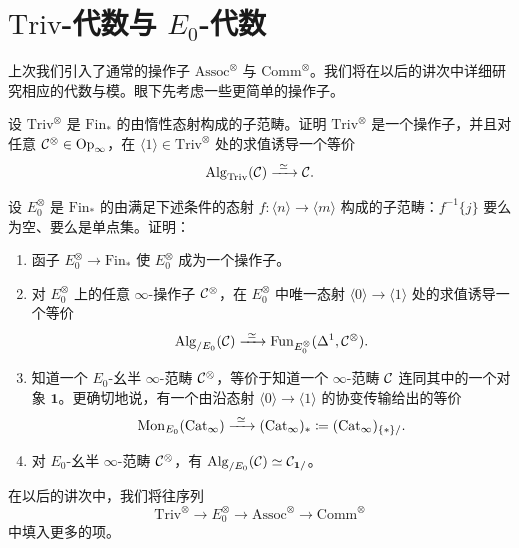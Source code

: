 
\section{$\mathrm{Triv}$-代数与 $E_{0}$-代数}

\nitem\label{L22-2.1} 上次我们引入了通常的操作子 $\mathrm{Assoc}^{\otimes}$ 与 $\mathrm{Comm}^{\otimes}$。我们将在以后的讲次中详细研究相应的代数与模。眼下先考虑一些更简单的操作子。

\begin{exercise}\label{L22-2.2}
设 $\mathrm{Triv}^{\otimes}$ 是 $\mathrm{Fin}_{*}$ 的由惰性态射构成的子范畴。证明 $\mathrm{Triv}^{\otimes}$ 是一个操作子，并且对任意 $\mathcal{C}^{\otimes}\in\mathrm{Op}_{\infty}$，在 $\langle1\rangle\in\mathrm{Triv}^{\otimes}$ 处的求值诱导一个等价
\[
\Alg_{\mathrm{Triv}}(\cC)\xrightarrow{\ \simeq\ }\cC.
\]
\end{exercise}

\begin{exercise}\label{L22-2.3}
设 $E_{0}^{\otimes}$ 是 $\mathrm{Fin}_{*}$ 的由满足下述条件的态射 $f\colon\langle n\rangle\to\langle m\rangle$ 构成的子范畴：$f^{-1}\{j\}$ 要么为空、要么是单点集。证明：
\begin{enumerate}[label=(\arabic*),leftmargin=2.4em,itemsep=0.1em]
\item 函子 $E_{0}^{\otimes}\to\mathrm{Fin}_{*}$ 使 $E_{0}^{\otimes}$ 成为一个操作子。
\item 对 $E_{0}^{\otimes}$ 上的任意 $\infty$-操作子 $\mathcal{C}^{\otimes}$，在 $E_{0}^{\otimes}$ 中唯一态射 $\langle0\rangle\to\langle1\rangle$ 处的求值诱导一个等价
\[
\Alg_{/E_{0}}(\cC)\xrightarrow{\ \simeq\ }\Fun_{E_{0}^{\otimes}}(\Delta^{1},\cC^{\otimes}).
\]
\item 知道一个 $E_{0}$-幺半 $\infty$-范畴 $\mathcal{C}^{\otimes}$，等价于知道一个 $\infty$-范畴 $\mathcal{C}$ 连同其中的一个对象 $\mathbf{1}$。更确切地说，有一个由沿态射 $\langle0\rangle\to\langle1\rangle$ 的协变传输给出的等价
\[
\Mon_{E_{0}}(\Cat_{\infty})\xrightarrow{\ \simeq\ }(\Cat_{\infty})_{*}\defeq(\Cat_{\infty})_{\{*\}/}.
\]
\item 对 $E_{0}$-幺半 $\infty$-范畴 $\mathcal{C}^{\otimes}$，有 $\operatorname{Alg}_{/E_{0}}(\mathcal{C})\simeq\mathcal{C}_{\mathbf{1}/}$。
\end{enumerate}
\end{exercise}

\begin{remark}\label{L22-2.4}
在以后的讲次中，我们将往序列
\[
\mathrm{Triv}^{\otimes}\to E_{0}^{\otimes}\to\mathrm{Assoc}^{\otimes}\to\mathrm{Comm}^{\otimes}
\]
中填入更多的项。
\end{remark}

